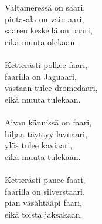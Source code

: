 
            Valtameressä on saari, \\
            pinta-ala on vain aari, \\
            saaren keskellä on baari, \\
            eikä muuta olekaan. \\
\hspace{10mm} \\
            Ketterästi polkee faari, \\
            faarilla on Jaguaari, \\
            vastaan tulee dromedaari, \\
            eikä muuta tulekaan. \\
\hspace{10mm} \\
            Aivan kännissä on faari, \\
            hiljaa täyttyy lavuaari, \\
            ylös tulee kaviaari, \\
            eikä muuta tulekaan. \\
\hspace{10mm} \\
            Ketterästi panee faari, \\
            faarilla on silverstaari, \\
            pian väsähtääpi faari, \\
            eikä toista jaksakaan. \\
